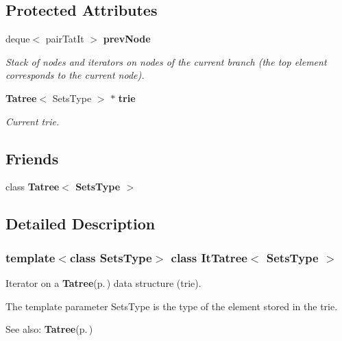 \subsection*{Protected Attributes}
\begin{CompactItemize}
\item 
deque$<$ pair\-Tat\-It $>$ {\bf prev\-Node}\label{class_it_tatree_48c9ebfd8b01b087b7d4348d194b926c}

\begin{CompactList}\small\item\em Stack of nodes and iterators on nodes of the current branch (the top element corresponds to the current node). \item\end{CompactList}\item 
{\bf Tatree}$<$ Sets\-Type $>$ $\ast$ {\bf trie}\label{class_it_tatree_51534fe17431a508af29636e3a7a5c29}

\begin{CompactList}\small\item\em Current trie. \item\end{CompactList}\end{CompactItemize}
\subsection*{Friends}
\begin{CompactItemize}
\item 
class {\bf Tatree$<$ Sets\-Type $>$}\label{class_it_tatree_d092d4c79b0d187f36b3f75573889423}

\end{CompactItemize}


\subsection{Detailed Description}
\subsubsection*{template$<$class Sets\-Type$>$ class It\-Tatree$<$ Sets\-Type $>$}

Iterator on a {\bf Tatree}{\rm (p.\,\pageref{class_tatree})} data structure (trie). 

The template parameter Sets\-Type is the type of the element stored in the trie. \begin{Desc}
\item[See also:]{\bf Tatree}{\rm (p.\,\pageref{class_tatree})} \end{Desc}




